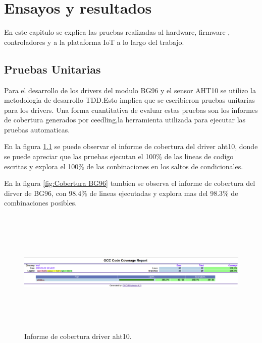
\chapter{Ensayos y resultados} %
En este capitulo se explica las pruebas realizadas al hardware, firmware , controladores y a la plataforma IoT a lo largo del trabajo.
\label{Chapter4} %


\section{Pruebas Unitarias}
Para el desarrollo de los drivers del modulo BG96 y el sensor AHT10 se utilizo la metodologia de desarrollo TDD.Esto implica que se escribieron pruebas unitarias para los drivers.
Una forma cuantitativa de evaluar estas pruebas son los informes de cobertura generados por ceedling,la herramienta utilizada para ejecutar las pruebas automaticas.

En la figura \ref{fig:Cobertura aht10} se puede observar el informe de cobertura del driver aht10, donde se puede apreciar que las pruebas ejecutan el 100\% de las lineas de codigo escritas y explora el 100\% de las conbinaciones en los saltos de condicionales.

En la figura \ref{fig:Cobertura BG96} tambien se observa el informe de cobertura del dirver de BG96, con 98.4\% de lineas ejecutadas y explora mas del 98.3\% de combinaciones posibles. 

\begin{figure}[h!]
    \centering
      \includegraphics[width=\linewidth, height=6cm]{./Figures/cobertura_aht10.png}
    \caption{Informe de cobertura driver aht10.}
      \label{fig:Cobertura aht10}
  \end{figure}

